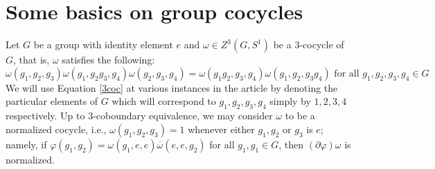 \section{Some basics on group cocycles}

Let $G$ be a group with identity element $e$ and $\omega \in Z^3(G, S^1)$ be a 3-cocycle of $G$, that is, $\omega$ satisfies the following:
\begin{equation}\label{3coc}
\omega(g_1,g_2,g_3) \omega(g_1,g_2g_3,g_4)\omega(g_2,g_3,g_4) = \omega(g_1g_2,g_3,g_4)\omega(g_1,g_2,g_3g_4) \text{ for all } g_1,g_2,g_3,g_4 \in G
\end{equation}
We will use Equation \ref{3coc} at various instances in the article by denoting the particular elements of $G$ which will correspond to $g_1,g_2,g_3,g_4$ simply by $1,2,3,4$ respectively.
Up to $3$-coboundary equivalence, we may consider  $\omega$ to be a normalized cocycle, i.e.,  $\omega(g_1, g_2, g_3) = 1$ whenever either $g_1, g_2$ or $g_3$ is $e$; namely, if $\varphi(g_1,g_2) = \omega(g_1, e, e) \overline{\omega}(e, e, g_2)$ for all $g_1, g_1 \in G$, then $(\partial \varphi) \omega$ is normalized.

